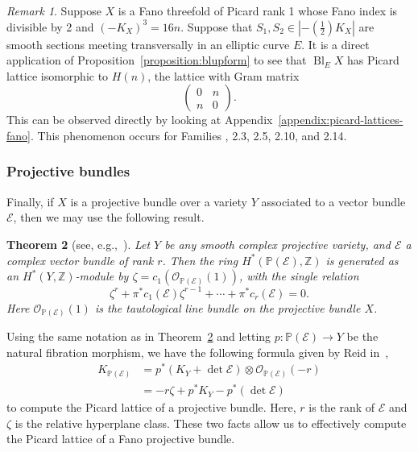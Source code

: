 \documentclass[10pt]{amsart}
\numberwithin{equation}{section}
\theoremstyle{plain}
\newtheorem{theorem}{Theorem}[section]
\theoremstyle{definition}
\theoremstyle{remark}
\newtheorem{remark}[theorem]{Remark}
\DeclareMathOperator{\Bl}{Bl}
\begin{document}
\begin{remark}
  Suppose \(X\) is a Fano threefold of Picard rank 1 whose Fano index is  divisible by 2 and \((-K_X)^3 = 16n\). Suppose that \(S_1,S_2 \in |-(\tfrac{1}{2})K_X|\) are smooth sections meeting transversally in an elliptic curve \(E\). It is a direct application of Proposition~\ref{proposition:blupform} to see that \(\Bl_EX\) has Picard lattice isomorphic to \(H(n)\), the lattice with Gram matrix
  \[
    \begin{pmatrix}
      0 & n \\
      n & 0
    \end{pmatrix}.
  \]
 This can be observed directly by looking at Appendix~\ref{appendix:picard-lattices-fano}. This phenomenon occurs for Families , 2.3, 2.5, 2.10, and 2.14.
\end{remark}

\subsubsection{Projective bundles}

Finally, if \(X\) is a projective bundle over a variety \(Y\) associated to a vector bundle \(\mathcal{E}\), then we may use the following result.

\begin{theorem}[see, e.g.,~{\cite[pp. 606]{griffiths2014principles}}]\label{theorem:GH}
  Let \(Y\) be any smooth complex projective variety, and \(\mathcal{E}\) a complex vector bundle of rank \(r\). Then the ring \(H^*(\mathbb{P}(\mathcal{E}),\mathbb{Z})\) is generated as an \(H^*(Y,\mathbb{Z})\)-module by \(\zeta = c_1(\mathcal{O}_{\mathbb{P}(\mathcal{E})}(1))\), with the single relation
  \[
    \zeta^r + \pi^* c_1(\mathcal{E})\zeta^{r-1} + \cdots + \pi^* c_r(\mathcal{E}) = 0.
  \]
  Here \(\mathcal{O}_{\mathbb{P}(\mathcal{E})}(1)\) is the tautological line bundle on the projective bundle \(X\).
\end{theorem}

Using the same notation as in Theorem~\ref{theorem:GH} and letting \(p:\mathbb{P}(\mathcal{E}) \rightarrow Y\) be the natural fibration morphism, we have the following formula given by Reid in~\cite[pp. 349]{reid46young},
\begin{align}\label{equation:Reid}
  K_{\mathbb{P}(\mathcal{E})} &= p^*(K_Y + \det \mathcal{E} ) \otimes \mathcal{O}_{\mathbb{P}(\mathcal{E})}(-r) \\
                              & = -r \zeta + p^* K_Y - p^*(\det \mathcal{E})
\end{align}
to compute the Picard lattice of a projective bundle. Here, \(r\) is the rank of \(\mathcal{E}\) and \(\zeta\) is the relative hyperplane class. These two facts allow us to effectively compute the Picard lattice of a Fano projective bundle.
\end{document}

